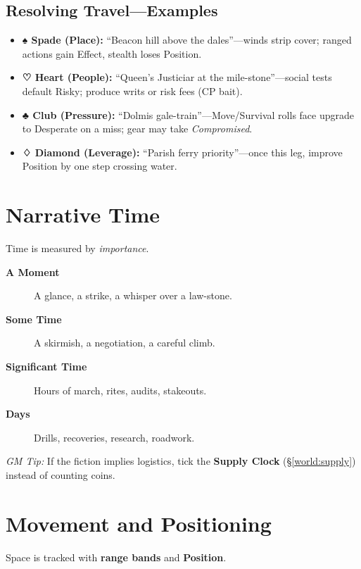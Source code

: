 \begin{multicols}{2}
\subsection*{Resolving Travel—Examples}
\begin{itemize}
  \item \textbf{♠ Spade (Place):} “Beacon hill above the dales”—winds strip cover; ranged actions gain Effect, stealth loses Position.
  \item \textbf{♡ Heart (People):} “Queen’s Justiciar at the mile-stone”—social tests default Risky; produce writs or risk fees (CP bait).
  \item \textbf{♣ Club (Pressure):} “Dolmis gale-train”—Move/Survival rolls face upgrade to Desperate on a miss; gear may take \emph{Compromised}.
  \item \textbf{♢ Diamond (Leverage):} “Parish ferry priority”—once this leg, improve Position by one step crossing water.
\end{itemize}

\section{Narrative Time}
Time is measured by \emph{importance}.
\begin{description}
  \item[\textbf{A Moment}]  A glance, a strike, a whisper over a law-stone.
  \item[\textbf{Some Time}]  A skirmish, a negotiation, a careful climb.
  \item[\textbf{Significant Time}]  Hours of march, rites, audits, stakeouts.
  \item[\textbf{Days}]  Drills, recoveries, research, roadwork.
\end{description}
\emph{GM Tip:} If the fiction implies logistics, tick the \textbf{Supply Clock} (\S\ref{world:supply}) instead of counting coins.

\section{Movement and Positioning}
Space is tracked with \textbf{range bands} and \textbf{Position}.


\end{multicols}
